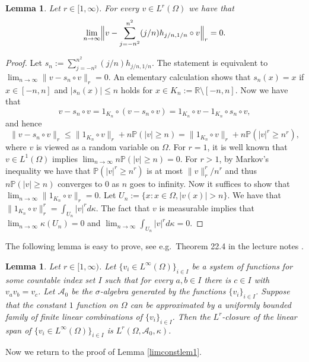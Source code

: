 \documentclass[a4wider]{amsart}
\newtheorem{lemma}[theorem]{Lemma}
\theoremstyle{definitionbreak}\newtheorem{D}[theorem]{Definition}
\theoremstyle{definitionbreak}\newtheorem*{D*}{Definition}
\begin{document}
\begin{lemma}\label{limconstlem2} Let $r\in [1,\infty)$. For every $v\in L^r(\Omega)$ we have that
$$\lim_{n\to \infty} \Bigl\|v-\sum_{j=-n^2}^{n^2} (j/n)h_{j/n,1/n}\circ v\Bigr\|_r=0.$$
\end{lemma}

\begin{proof} Let $s_n:=\sum_{j=-n^2}^{n^2} (j/n)h_{j/n,1/n}$. The statement is equivalent to $\lim_{n\to\infty}\|v-s_n\circ v\|_r=0$. An elementary calculation shows that $s_n(x)=x$ if $x\in [-n,n]$ and $|s_n(x)|\leq n$ holds for $x\in K_n:=\mathbb{R}\setminus [-n,n]$. Now we have that $$v-s_n\circ v=1_{K_n}\circ(v-s_n\circ v)=1_{K_n}\circ v-1_{K_n}\circ s_n\circ v,$$ and hence $$\|v-s_n\circ v\|_r\leq \|1_{K_n}\circ v\|_r+n\mathbb{P}(|v|\geq n)=\|1_{K_n}\circ v\|_r+n\mathbb{P}(|v|^r\geq n^r),$$ where $v$ is viewed as a random variable on $\Omega$. For $r=1$, it is well known that $v\in L^1(\Omega)$ implies $\lim_{n\rightarrow\infty} n \mathbb P(|v|\geq n)=0$. For $r>1$, by Markov's inequality we have that $\mathbb{P}(|v|^r\geq n^r)$ is at most $\|v\|_r^r/n^r$ and thus $n\mathbb{P}(|v|\geq n)$ converges to $0$ as $n$ goes to infinity. Now it suffices to show that $\lim_{n\to\infty}\|1_{K_n}\circ v\|_r=0$. Let $U_n:=\{x:x\in\Omega , |v(x)|>n\}$. We have that $\|1_{K_n}\circ v\|^r_r=\int_{U_n} |v|^r d\kappa$.  The fact that $v$ is measurable implies that $\lim_{n\to\infty} \kappa(U_n)=0$ and $\lim_{n\to\infty}\int_{U_n} |v|^r d\kappa=0$.
\end{proof}

The following lemma is easy to prove, see e.g.\ Theorem 22.4 in the lecture notes \cite{lemma45}.

\begin{lemma}\label{limconstlem3} Let $r\in [1,\infty)$. Let $\{v_i\in L^\infty(\Omega)\}_{i\in I}$ be a system of functions for some countable index set $I$ such that for every $a,b\in I$ there is $c\in I$ with $v_av_b=v_c$. Let $\mathcal{A}_0$ be the $\sigma$-algebra generated by the functions $\{v_i\}_{i\in I}$. Suppose that the constant $1$ function on $\Omega$ can be approximated by a uniformly bounded family of finite linear combinations of $\{v_i\}_{i\in I}$. Then the $L^r$-closure of the linear span of $\{v_i\in L^\infty(\Omega)\}_{i\in I}$ is $L^r(\Omega,\mathcal{A}_0,\kappa)$.
\end{lemma}

Now we return to the proof of Lemma \ref{limconstlem1}.
\end{document}
